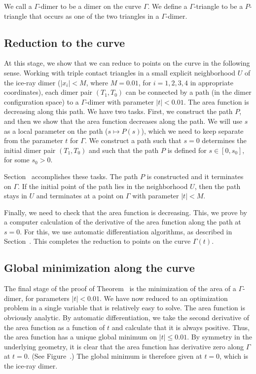 We call a $\Gamma$-dimer to be a dimer on the curve $\Gamma$.  We
define a $\Gamma$-triangle to be a $P$-triangle that occurs as one of
the two triangles in a $\Gamma$-dimer.


\subsection{Reduction to the curve}

At this stage, we show that we can reduce to points on the curve in
the following sense.  Working with triple contact triangles in a small
explicit neighborhood $U$ of the ice-ray dimer ($|x_i|<M$, where
$M=0.01$, for $i=1,2,3,4$ in appropriate coordinates), each dimer pair
$(T_1,T_0)$ can be connected by a path (in the dimer configuration
space) to a $\Gamma$-dimer with parameter $|t|<0.01$.  The area
function is decreasing along this path.  We have two tasks.  First, we
construct the path $P$, and then we show that the area function
decreases along the path.  We will use $s$ as a local parameter on the
path ($s\mapsto P(s)$), which we need to keep separate from the
parameter $t$ for $\Gamma$.  We construct a path such that $s=0$
determines the initial dimer pair $(T_1,T_0)$ and such that the path
$P$ is defined for $s\in [0,s_0]$, for some $s_0>0$.

Section~ accomplishes these tasks.  The path $P$ is
constructed and it terminates on $\Gamma$.  If the initial point of
the path lies in the neighborhood $U$, then the path stays in $U$
and terminates at a point on $\Gamma$ with parameter $|t|<M$.

Finally, we need to check that the area function is decreasing. This,
we prove by a computer calculation of the derivative of the area
function along the path at $s=0$.  For this, we use automatic
differentiation algorithms, as described in
Section~.  This completes the reduction to points
on the curve $\Gamma(t)$.

\subsection{Global minimization along the curve}

The final stage of the proof of Theorem~ is the
minimization of the area of a $\Gamma$-dimer, for parameters
$|t|<0.01$.  We have now reduced to an optimization problem in a
single variable that is relatively easy to solve.  The area function
is obviously analytic.  By automatic differentiation, we take the
second derivative of the area function as a function of $t$ and
calculate that it is always positive.  Thus, the area function has a
unique global minimum on $|t|\le 0.01$.  By symmetry in the underlying
geometry, it is clear that the area function has derivative zero along
$\Gamma$ at $t=0$.  (See Figure~.) The global
minimum is therefore given at $t=0$, which is the ice-ray dimer.


